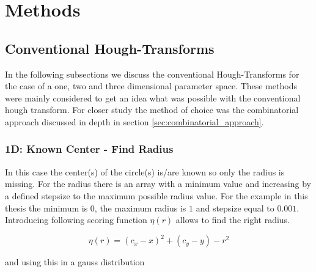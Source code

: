\documentclass[11pt,twoside]{scrreprt}
\begin{document}


\chapter{Methods}

\section{Conventional Hough-Transforms} %
\label{sec:conventional_hough_transforms}

In the following subsections we discuss the conventional Hough-Transforms for the case of a one, two and three dimensional parameter space. These
methods were mainly considered to get an idea what was possible with the conventional hough transform. For closer study the method of choice was
the combinatorial approach discussed in depth in section \ref{sec:combinatorial_approach}.

\subsection{1D: Known Center - Find Radius} %
\label{sub:1d_known_center_find_radius}

In this case the center(s) of the circle(s) is/are known so only the radius is missing. For the radius there is an array with a minimum value
and increasing by a defined stepsize to the maximum possible radius value. For the example in this thesis the minimum is $0$, the maximum radius
is $1$ and stepsize equal to $0.001$. Introducing following scoring function $\eta(r)$ allows to find the right radius.

\begin{equation}
\label{eq:score_function}
  \eta(r) = (c_x - x)^2 + (c_y - y) - r ^ 2
\end{equation}

and using this in a gauss distribution
\end{document}
